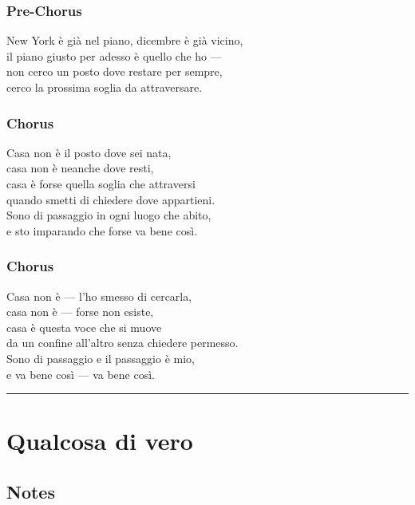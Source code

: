 \subsubsection{Pre-Chorus}\label{pre-chorus-25}

New York è già nel piano, dicembre è già vicino,\\
il piano giusto per adesso è quello che ho ---\\
non cerco un posto dove restare per sempre,\\
cerco la prossima soglia da attraversare.

\subsubsection{Chorus}\label{chorus-35}

Casa non è il posto dove sei nata,\\
casa non è neanche dove resti,\\
casa è forse quella soglia che attraversi\\
quando smetti di chiedere dove appartieni.\\
Sono di passaggio in ogni luogo che abito,\\
e sto imparando che forse va bene così.

\subsubsection{Chorus}\label{chorus-36}

Casa non è --- l'ho smesso di cercarla,\\
casa non è --- forse non esiste,\\
casa è questa voce che si muove\\
da un confine all'altro senza chiedere permesso.\\
Sono di passaggio e il passaggio è mio,\\
e va bene così --- va bene così.

\begin{center}\rule{0.5\linewidth}{0.5pt}\end{center}

\section{Qualcosa di vero}\label{qualcosa-di-vero}

\subsection{Notes}\label{notes-16}

